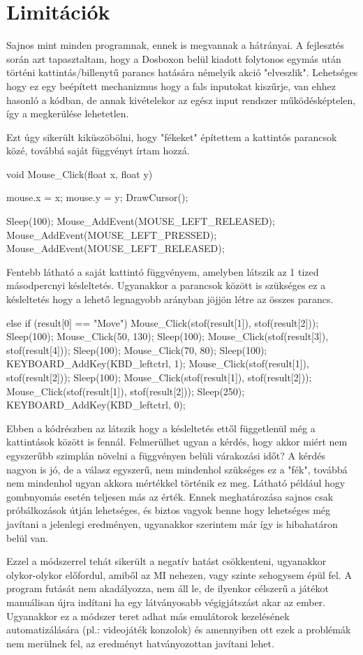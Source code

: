 \section{Limitációk}

Sajnos mint minden programnak, ennek is megvannak a hátrányai. A fejlesztés során azt tapasztaltam, hogy a Dosboxon belül kiadott folytonos egymás után történi kattintás/billenytű parancs hatására némelyik akció "elveszlik". Lehetséges hogy ez egy beépített mechanizmus hogy a fals inputokat kiszűrje, van ehhez hasonló a kódban, de annak kivételekor az egész input rendszer működésképtelen, így a megkerülése lehetetlen.

Ezt úgy sikerült kiküszöbölni, hogy "fékeket" építettem a kattintós parancsok közé, továbbá saját függvényt írtam hozzá.

\begin{cpp}
void Mouse_Click(float x, float y) {
    mouse.x = x;
    mouse.y = y;
    DrawCursor();
    
    Sleep(100);
    Mouse_AddEvent(MOUSE_LEFT_RELEASED);
    Mouse_AddEvent(MOUSE_LEFT_PRESSED);
    Mouse_AddEvent(MOUSE_LEFT_RELEASED);   
}
\end{cpp}

Fentebb látható a saját kattintó függvényem, amelyben látszik az 1 tized másodpercnyi késleltetés. Ugyanakkor a parancsok között is szükséges ez a késleltetés hogy a lehető legnagyobb arányban jöjjön létre az összes parancs.

\begin{cpp}
else if (result[0] == "Move")
{
    Mouse_Click(stof(result[1]), stof(result[2]));
    Sleep(100);
    Mouse_Click(50, 130);
    Sleep(100);
    Mouse_Click(stof(result[3]), stof(result[4]));
    Sleep(100);
    Mouse_Click(70, 80);
    Sleep(100);
    KEYBOARD_AddKey(KBD_leftctrl, 1);	
    Mouse_Click(stof(result[1]), stof(result[2]));
    Sleep(100);
    Mouse_Click(stof(result[1]), stof(result[2]));
    Mouse_Click(stof(result[1]), stof(result[2]));
    Sleep(250);
    KEYBOARD_AddKey(KBD_leftctrl, 0);
}
\end{cpp}

Ebben a kódrészben az látszik hogy a késleltetés ettől függetlenül még a kattintások között is fennál. Felmerülhet ugyan a kérdés, hogy akkor miért nem egyszerűbb szimplán növelni a függvényen belüli várakozási időt? A kérdés nagyon is jó, de a válasz egyszerű, nem mindenhol szükséges ez a "fék", továbbá nem mindenhol ugyan akkora mértékkel történik ez meg. Látható például hogy gombnyomás esetén teljesen más az érték. Ennek meghatározása sajnos csak próbálkozások útján lehetséges, és biztos vagyok benne hogy lehetséges még javítani a jelenlegi eredményen, ugyanakkor szerintem már így is hibahatáron belül van.

Ezzel a módszerrel tehát sikerült a negatív hatást csökkenteni, ugyanakkor olykor-olykor előfordul, amiből az MI nehezen, vagy szinte sehogysem épül fel. A program futását nem akadályozza, nem áll le, de ilyenkor célszerű a játékot manuálisan újra indítani ha egy látványosabb végigjátszást akar az ember. Ugyanakkor ez a módszer teret adhat más emulátorok kezelésének automatizálására (pl.: videojáték konzolok) és amennyiben ott ezek a problémák nem merülnek fel, az eredményt hatványozottan javítani lehet.